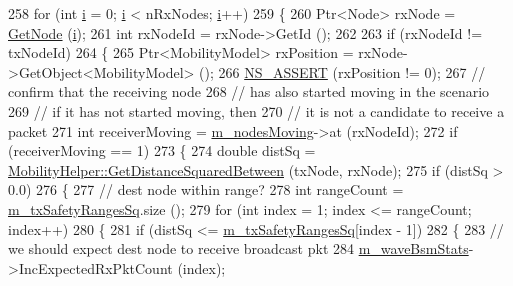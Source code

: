 \begin{DoxyCode}
258           \textcolor{keywordflow}{for} (\textcolor{keywordtype}{int} \hyperlink{bernuolliDistribution_8m_a6f6ccfcf58b31cb6412107d9d5281426}{i} = 0; \hyperlink{bernuolliDistribution_8m_a6f6ccfcf58b31cb6412107d9d5281426}{i} < nRxNodes; \hyperlink{bernuolliDistribution_8m_a6f6ccfcf58b31cb6412107d9d5281426}{i}++)
259             \{
260               Ptr<Node> rxNode = \hyperlink{classns3_1_1Application_a664b15088389bec8e35b35742138f097}{GetNode} (\hyperlink{bernuolliDistribution_8m_a6f6ccfcf58b31cb6412107d9d5281426}{i});
261               \textcolor{keywordtype}{int} rxNodeId = rxNode->GetId ();
262 
263               \textcolor{keywordflow}{if} (rxNodeId != txNodeId)
264                 \{
265                   Ptr<MobilityModel> rxPosition = rxNode->GetObject<MobilityModel> ();
266                   \hyperlink{assert_8h_a6dccdb0de9b252f60088ce281c49d052}{NS\_ASSERT} (rxPosition != 0);
267                   \textcolor{comment}{// confirm that the receiving node}
268                   \textcolor{comment}{// has also started moving in the scenario}
269                   \textcolor{comment}{// if it has not started moving, then}
270                   \textcolor{comment}{// it is not a candidate to receive a packet}
271                   \textcolor{keywordtype}{int} receiverMoving = \hyperlink{classns3_1_1BsmApplication_a573c92bdce7e395c9509e3b856d8fa6c}{m\_nodesMoving}->at (rxNodeId);
272                   \textcolor{keywordflow}{if} (receiverMoving == 1)
273                     \{
274                       \textcolor{keywordtype}{double} distSq = \hyperlink{classns3_1_1MobilityHelper_a4471ab3605ba031e02ee90fc43bf8c5d}{MobilityHelper::GetDistanceSquaredBetween}
       (txNode, rxNode);
275                       \textcolor{keywordflow}{if} (distSq > 0.0)
276                         \{
277                           \textcolor{comment}{// dest node within range?}
278                           \textcolor{keywordtype}{int} rangeCount = \hyperlink{classns3_1_1BsmApplication_a2e160b9460506f5d689f9a397504e13b}{m\_txSafetyRangesSq}.size ();
279                           \textcolor{keywordflow}{for} (\textcolor{keywordtype}{int} index = 1; index <= rangeCount; index++)
280                             \{
281                               \textcolor{keywordflow}{if} (distSq <= \hyperlink{classns3_1_1BsmApplication_a2e160b9460506f5d689f9a397504e13b}{m\_txSafetyRangesSq}[index - 1])
282                                 \{
283                                   \textcolor{comment}{// we should expect dest node to receive broadcast pkt}
284                                   \hyperlink{classns3_1_1BsmApplication_afc424d5340ea34ee3099625627b8c036}{m\_waveBsmStats}->IncExpectedRxPktCount (index);

\end{DoxyCode}
